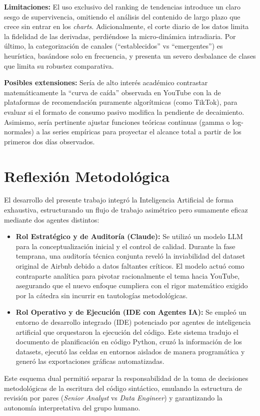 \documentclass[12pt,a4paper]{article}
\begin{document}
\textbf{Limitaciones:} El uso exclusivo del ranking de tendencias introduce un claro sesgo de supervivencia, omitiendo el análisis del contenido de largo plazo que crece sin entrar en los \textit{charts}. Adicionalmente, el corte diario de los datos limita la fidelidad de las derivadas, perdiéndose la micro-dinámica intradiaria. Por último, la categorización de canales (``establecidos'' vs ``emergentes'') es heurística, basándose solo en frecuencia, y presenta un severo desbalance de clases que limita su robustez comparativa.

\textbf{Posibles extensiones:} Sería de alto interés académico contrastar matemáticamente la ``curva de caída'' observada en YouTube con la de plataformas de recomendación puramente algorítmicas (como TikTok), para evaluar si el formato de consumo pasivo modifica la pendiente de decaimiento. Asimismo, sería pertinente ajustar funciones teóricas continuas (gamma o log-normales) a las series empíricas para proyectar el alcance total a partir de los primeros dos días observados.

\section{Reflexión Metodológica}
El desarrollo del presente trabajo integró la Inteligencia Artificial de forma exhaustiva, estructurando un flujo de trabajo asimétrico pero sumamente eficaz mediante dos agentes distintos:

\begin{itemize}
    \item \textbf{Rol Estratégico y de Auditoría (Claude):} Se utilizó un modelo LLM para la conceptualización inicial y el control de calidad. Durante la fase temprana, una auditoría técnica conjunta reveló la inviabilidad del dataset original de Airbnb debido a datos faltantes críticos. El modelo actuó como contraparte analítica para pivotar racionalmente el tema hacia YouTube, asegurando que el nuevo enfoque cumpliera con el rigor matemático exigido por la cátedra sin incurrir en tautologías metodológicas.
    \item \textbf{Rol Operativo y de Ejecución (IDE con Agentes IA):} Se empleó un entorno de desarrollo integrado (IDE) potenciado por agentes de inteligencia artificial que orquestaron la ejecución del código. Este sistema tradujo el documento de planificación en código Python, cruzó la información de los datasets, ejecutó las celdas en entornos aislados de manera programática y generó las exportaciones gráficas automatizadas.
\end{itemize}

Este esquema dual permitió separar la responsabilidad de la toma de decisiones metodológicas de la escritura del código sintáctico, emulando la estructura de revisión por pares (\textit{Senior Analyst} vs \textit{Data Engineer}) y garantizando la autonomía interpretativa del grupo humano.
\end{document}

